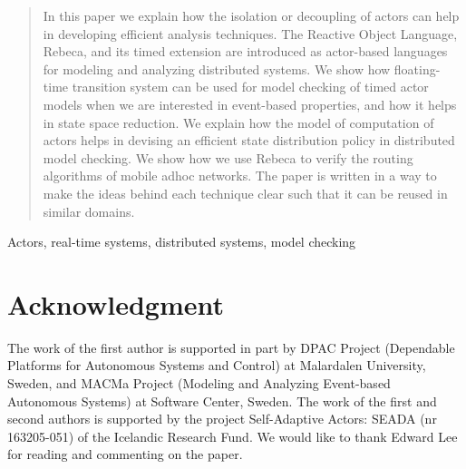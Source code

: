 \documentclass[conference]{IEEEtran}
\newcommand{\fixme}[1]{{\color{red}\textbf{FIXME:} #1}}
\begin{document}
	\begin{abstract}
	In this paper we explain how the isolation or decoupling of actors can help in developing efficient analysis techniques. The Reactive Object Language, Rebeca, and its timed extension are introduced as actor-based languages for modeling and analyzing distributed systems.
We show how floating-time transition system can be used for model checking of timed actor models when we are interested in event-based properties, and how it helps in state space reduction. We explain how the model of computation of actors helps in devising an efficient state distribution policy in distributed model checking. We show how we use Rebeca to  verify the routing algorithms of mobile adhoc networks. The paper is written in a way to make the ideas behind each technique clear such that it can be reused in similar domains.
		
	\end{abstract}
	
	\begin{IEEEkeywords}
		Actors, real-time  systems, distributed systems, model checking\end{IEEEkeywords}
	

%
%
%





	
	
	
	\section*{Acknowledgment}
	The work of the first author is supported in part by DPAC Project (Dependable Platforms for
Autonomous Systems and Control) at Malardalen University, Sweden, and MACMa Project (Modeling and Analyzing Event-based Autonomous Systems) at Software Center, Sweden. The work of the first and second authors is supported by the
project Self-Adaptive Actors: SEADA (nr 163205-051) of the Icelandic Research
Fund. We would like to thank Edward Lee for reading and commenting on the paper.
	
	
	
	
	
	\balance
\end{document}
